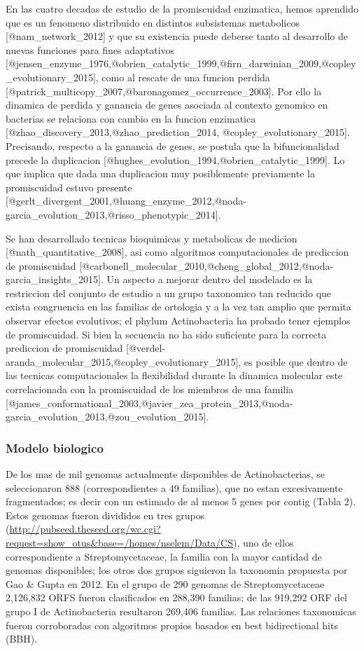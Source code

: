 \documentclass[]{article}
\begin{document}
En las cuatro decadas de estudio de la promiscuidad enzimatica, hemos
aprendido que es un fenomeno distribuido en distintos subsistemas
metabolicos {[}@nam\_network\_2012{]} y que su existencia puede deberse
tanto al desarrollo de nuevas funciones para fines adaptativos
{[}@jensen\_enzyme\_1976,@obrien\_catalytic\_1999,@firn\_darwinian\_2009,@copley\_evolutionary\_2015{]},
como al rescate de una funcion perdida
{[}@patrick\_multicopy\_2007,@baronagomez\_occurrence\_2003{]}. Por ello
la dinamica de perdida y ganancia de genes asociada al contexto genomico
en bacterias se relaciona con cambio en la funcion enzimatica
{[}@zhao\_discovery\_2013,@zhao\_prediction\_2014,
@copley\_evolutionary\_2015{]}. Precisando, respecto a la ganancia de
genes, se postula que la bifuncionalidad precede la duplicacion
{[}@hughes\_evolution\_1994,@obrien\_catalytic\_1999{]}. Lo que implica
que dada una duplicacion muy posiblemente previamente la promiscuidad
estuvo presente
{[}@gerlt\_divergent\_2001,@huang\_enzyme\_2012,@noda-garcia\_evolution\_2013,@risso\_phenotypic\_2014{]}.

Se han desarrollado tecnicas bioquimicas y metabolicas de medicion
{[}@nath\_quantitative\_2008{]}, asi como algoritmos computacionales de
prediccion de promiscuidad
{[}@carbonell\_molecular\_2010,@cheng\_global\_2012,@noda-garcia\_insights\_2015{]}.
Un aspecto a mejorar dentro del modelado es la restriccion del conjunto
de estudio a un grupo taxonomico tan reducido que exista congruencia en
las familias de ortologia y a la vez tan amplio que permita observar
efectos evolutivos; el phylum Actinobacteria ha probado tener ejemplos
de promiscuidad. Si bien la secuencia no ha sido suficiente para la
correcta prediccion de promiscuidad
{[}@verdel-aranda\_molecular\_2015,@copley\_evolutionary\_2015{]}, es
posible que dentro de las tecnicas computacionales la flexibilidad
durante la dinamica molecular este correlacionada con la promiscuidad de
los miembros de una familia
{[}@james\_conformational\_2003,@javier\_zea\_protein\_2013,@noda-garcia\_evolution\_2013,@zou\_evolution\_2015{]}.

\subsubsection{Modelo biologico}\label{modelo-biologico}

De los mas de mil genomas actualmente disponibles de Actinobacterias, se
seleccionaron 888 (correspondientes a 49 familias), que no estan
excesivamente fragmentados; es decir con un estimado de al menos 5 genes
por contig (Tabla 2). Estos genomas fueron divididos en tres grupos
(\url{http://pubseed.theseed.org/wc.cgi?request=show_otus\&base=/homes/nselem/Data/CS}),
uno de ellos correspondiente a Streptomycetaceae, la familia con la
mayor cantidad de genomas disponibles; los otros dos grupos siguieron la
taxonomia propuesta por Gao \& Gupta en 2012. En el grupo de 290 genomas
de Streptomycetaceae 2,126,832 ORFS fueron clasificados en 288,390
familias; de las 919,292 ORF del grupo I de Actinobacteria resultaron
269,406 familias. Las relaciones taxonomicas fueron corroboradas con
algoritmos propios basados en best bidirectional hits (BBH).
\end{document}
